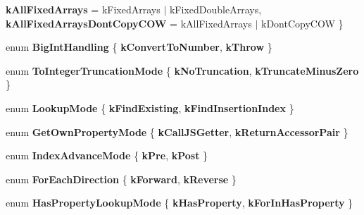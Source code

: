 \begin{DoxyCompactItemize}
{\bfseries k\+All\+Fixed\+Arrays} = k\+Fixed\+Arrays $\vert$ k\+Fixed\+Double\+Arrays, 
{\bfseries k\+All\+Fixed\+Arrays\+Dont\+Copy\+C\+OW} = k\+All\+Fixed\+Arrays $\vert$ k\+Dont\+Copy\+C\+OW
 \}
\item 
\mbox{\label{classv8_1_1internal_1_1CodeStubAssembler_ae4f2a403866bf10e8809556cea56143f}} 
enum {\bfseries Big\+Int\+Handling} \{ {\bfseries k\+Convert\+To\+Number}, 
{\bfseries k\+Throw}
 \}
\item 
\mbox{\label{classv8_1_1internal_1_1CodeStubAssembler_a146b24b78132647f58c1f2fce8d7f5ae}} 
enum {\bfseries To\+Integer\+Truncation\+Mode} \{ {\bfseries k\+No\+Truncation}, 
{\bfseries k\+Truncate\+Minus\+Zero}
 \}
\item 
\mbox{\label{classv8_1_1internal_1_1CodeStubAssembler_aae73bb07e49400741afe113e03b61b10}} 
enum {\bfseries Lookup\+Mode} \{ {\bfseries k\+Find\+Existing}, 
{\bfseries k\+Find\+Insertion\+Index}
 \}
\item 
\mbox{\label{classv8_1_1internal_1_1CodeStubAssembler_a46486e7c49656bbef68a7cd41d4b3a18}} 
enum {\bfseries Get\+Own\+Property\+Mode} \{ {\bfseries k\+Call\+J\+S\+Getter}, 
{\bfseries k\+Return\+Accessor\+Pair}
 \}
\item 
\mbox{\label{classv8_1_1internal_1_1CodeStubAssembler_af5b7528a1ded3f8062a08a96f46fd30a}} 
enum {\bfseries Index\+Advance\+Mode} \{ {\bfseries k\+Pre}, 
{\bfseries k\+Post}
 \}
\item 
\mbox{\label{classv8_1_1internal_1_1CodeStubAssembler_afca7bf0f64aab34335554b019256b039}} 
enum {\bfseries For\+Each\+Direction} \{ {\bfseries k\+Forward}, 
{\bfseries k\+Reverse}
 \}
\item 
\mbox{\label{classv8_1_1internal_1_1CodeStubAssembler_abf9426e81133531325ed3ce58dd56d3e}} 
enum {\bfseries Has\+Property\+Lookup\+Mode} \{ {\bfseries k\+Has\+Property}, 
{\bfseries k\+For\+In\+Has\+Property}
 \}
\item 
\mbox{\label{classv8_1_1internal_1_1CodeStubAssembler_ad896b87e7b938ae026250ce81c7d0280}} 

\end{DoxyCompactItemize}
